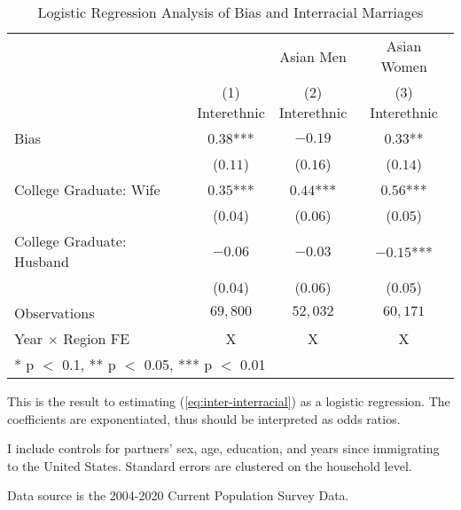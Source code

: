 \begin{table}[H]
\centering\centering
\caption{Logistic Regression Analysis of Bias and Interracial Marriages \label{regtab-logit-03}}
\centering
\begin{threeparttable}
\begin{tabular}[t]{lccc}
\toprule
\multicolumn{2}{c}{ } & \multicolumn{1}{c}{Asian Men} & \multicolumn{1}{c}{Asian Women} \\
\cmidrule(l{3pt}r{3pt}){3-3} \cmidrule(l{3pt}r{3pt}){4-4}
  & \specialcell{(1) \\ Interethnic} & \specialcell{(2) \\ Interethnic} & \specialcell{(3) \\ Interethnic}\\
\midrule
Bias & $0.38$*** & $-0.19$ & $0.33$**\\
 & ($0.11$) & ($0.16$) & ($0.14$)\\
College Graduate: Wife & $0.35$*** & $0.44$*** & $0.56$***\\
 & ($0.04$) & ($0.06$) & \vphantom{1} ($0.05$)\\
College Graduate: Husband & $-0.06$ & $-0.03$ & $-0.15$***\\
 & ($0.04$) & ($0.06$) & ($0.05$)\\
\midrule
Observations & $69,800$ & $52,032$ & $60,171$\\
Year $\times$ Region FE & X & X & X\\
\bottomrule
\multicolumn{4}{l}{\rule{0pt}{1em}* p $<$ 0.1, ** p $<$ 0.05, *** p $<$ 0.01}\\
\end{tabular}
\begin{tablenotes}
\small
\item[1] \footnotesize{This is the result to estimating (\ref{eq:inter-interracial}) as a
                        logistic regression. The coefficients are exponentiated, thus should be interpreted as odds ratios.}
\item[2] \footnotesize{I include controls for partners' sex, age, education, 
                      and years since immigrating to the United States.
                      Standard errors are clustered on the household level.}
\item[3] \footnotesize{Data source is the 2004-2020 Current Population Survey Data.}
\end{tablenotes}
\end{threeparttable}
\end{table}

